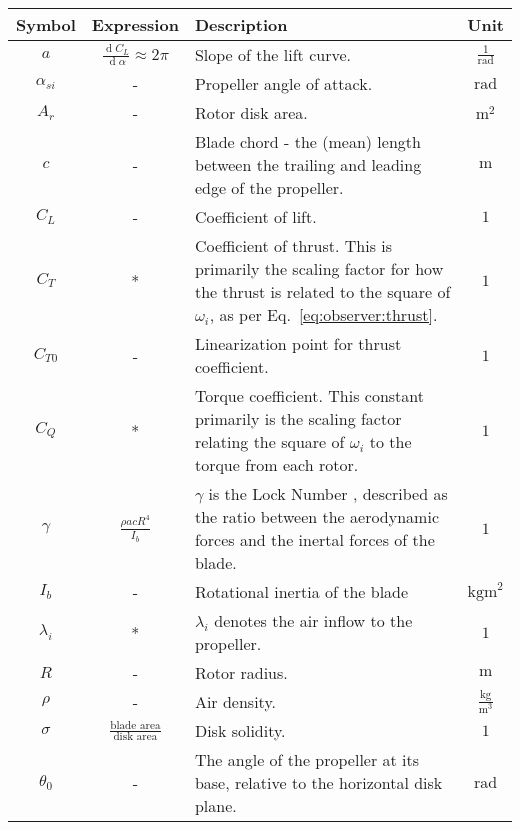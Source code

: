     \begin{table}
        \begin{tabularx}{\tablewidth}{|c|c|X|c|}\hline
            \textbf{Symbol} & \textbf{Expression} & \textbf{Description}  & \textbf{Unit} \\\hline
            $a$ & $\frac{\operatorname{d}\!C_{L}}{\operatorname{d}\!\alpha} \approx 2\pi$ & Slope of the lift curve. & $\frac{1}{\text{rad}}$ \\\hline
            $\alpha_{si}$ & - & Propeller angle of attack. & $\text{rad}$ \\\hline
            $A_{r}$ & - & Rotor disk area.   & $\text{m}^{2}$\\\hline
            $c$ & - & Blade chord - the (mean) length between the trailing and leading edge of the propeller.   & $\text{m}$ \\\hline
            $C_{L}$ & - & Coefficient of lift. & $1$ \\\hline
            $C_{T}$ & * & Coefficient of thrust. This is primarily the scaling factor for how the thrust is related to the square of $\omega_{i}$, as per Eq.~\ref{eq:observer:thrust}.  & $1$\\\hline
            $C_{T0}$ & - & Linearization point for thrust coefficient.  & $1$\\\hline
            $C_{Q}$ & * & Torque coefficient. This constant primarily is the scaling factor relating the square of $\omega_{i}$ to the torque from each rotor. & $1$\\\hline
            $\gamma$ & $\frac{\rho a c R^{4}}{I_{b}}$ & $\gamma$ is the Lock Number \citep{leishman2002principles}, described as the ratio between the aerodynamic forces and the inertal forces of the blade.   & $1$ \\ \hline
            $I_{b}$ & - & Rotational inertia of the blade  & $\text{kgm}^{2}$\\\hline
            $\lambda_{i}$ & * & $\lambda_{i}$ denotes the air inflow to the propeller. & $1$ \\\hline
            $R$ & - & Rotor radius.   & $\text{m}$ \\\hline
            $\rho$ & - & Air density.   & $\frac{\text{kg}}{\text{m}^{3}}$ \\\hline
            $\sigma$ & $\frac{\text{blade area}}{\text{disk area}}$ & Disk solidity. & $1$ \\\hline
            $\theta_{0}$ & - & The angle of the propeller at its base, relative to the horizontal disk plane. & $\text{rad}$ \\\hline

\end{tabularx}
\end{table}

